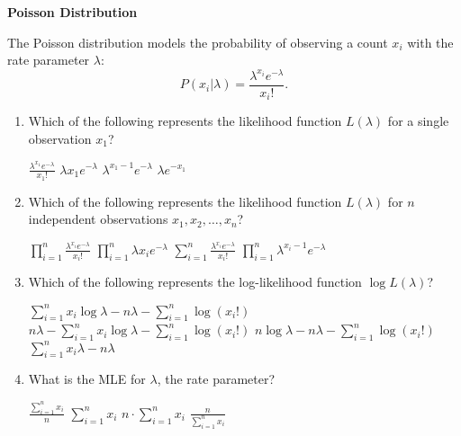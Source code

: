 \documentclass[12pt,letterpaper, onecolumn]{exam}
\begin{document}
\begin{questions}
\question[10 points]\textbf{Poisson Distribution}\droppoints

The Poisson distribution models the probability of observing a count \( x_i \) with the rate parameter \( \lambda \):
\[
P(x_i | \lambda) = \frac{\lambda^{x_i} e^{-\lambda}}{x_i!}.
\]

\begin{enumerate}[label=(\alph*)]
    \item Which of the following represents the likelihood function \( L(\lambda) \) for a single observation \( x_1 \)?
    \begin{choices}
        \choice \( \frac{\lambda^{x_1} e^{-\lambda}}{x_1!} \)
        \choice \( \lambda x_1 e^{-\lambda} \)
        \choice \( \lambda^{x_1 - 1} e^{-\lambda} \)
        \choice \( \lambda e^{-x_1} \)
    \end{choices}
    \item Which of the following represents the likelihood function \( L(\lambda) \) for \( n \) independent observations \( x_1, x_2, \ldots, x_n \)?
    \begin{choices}
        \choice \( \prod_{i=1}^n \frac{\lambda^{x_i} e^{-\lambda}}{x_i!} \)
        \choice \( \prod_{i=1}^n \lambda x_i e^{-\lambda} \)
        \choice \( \sum_{i=1}^n \frac{\lambda^{x_i} e^{-\lambda}}{x_i!} \)
        \choice \( \prod_{i=1}^n \lambda^{x_i - 1} e^{-\lambda} \)
    \end{choices}
    \item Which of the following represents the log-likelihood function \( \log L(\lambda) \)?
    \begin{choices}
        \choice \( \sum_{i=1}^n x_i \log \lambda - n\lambda - \sum_{i=1}^n \log(x_i!) \)
        \choice \( n \lambda - \sum_{i=1}^n x_i \log \lambda - \sum_{i=1}^n \log(x_i!) \)
        \choice \( n \log \lambda - n\lambda - \sum_{i=1}^n \log(x_i!) \)
        \choice \( \sum_{i=1}^n x_i \lambda - n\lambda \)
    \end{choices}
    \item What is the MLE for \( \lambda \), the rate parameter?
    \begin{choices}
        \choice \( \frac{\sum_{i=1}^n x_i}{n} \)
        \choice \( \sum_{i=1}^n x_i \)
        \choice \( n \cdot \sum_{i=1}^n x_i \)
        \choice \( \frac{n}{\sum_{i=1}^n x_i} \)
    \end{choices}
\end{enumerate}

\begin{solution}
    \begin{parts}

\end{parts}
\end{solution}
\end{questions}
\end{document}
